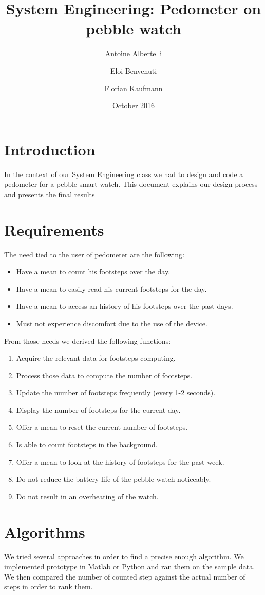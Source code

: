 \documentclass[12pt,twoside,a4paper]{article}
\title{System Engineering: Pedometer on pebble watch}
\author{Antoine Albertelli \and Eloi Benvenuti \and Florian Kaufmann}
\date{October 2016}
\begin{document}
\maketitle

\section{Introduction}
In the context of our System Engineering class we had to design and code a pedometer for a pebble smart	watch. This document explains our design process and presents the final results
\section{Requirements}
\label{requirements}
The need tied to the user of pedometer are the following:
\begin{itemize}
	\item Have a mean to count his footsteps over the day.
	\item Have a mean to easily read his current footsteps for the day.
	\item Have a mean to access an history of his footsteps over the past days.
	\item Must not experience discomfort due to the use of the device.
\end{itemize}

From those needs we derived the following functions:
\begin{enumerate}
	\item Acquire the relevant data for footsteps computing.
	\item Process those data to compute the number of footsteps.
	\item Update the number of footsteps frequently (every 1-2 seconds).
	\item Display the number of footsteps for the current day.
	\item Offer a mean to reset the current number of footsteps.
	\item Is able to count footsteps in the background.
	\item Offer a mean to look at the history of footsteps for the past week.
	\item Do not reduce the battery life of the pebble watch noticeably.
	\item Do not result in an overheating of the watch.
\end{enumerate}

\section{Algorithms}
We tried several approaches in order to find a precise enough algorithm.
We implemented prototype in Matlab or Python and ran them on the sample data.
We then compared the number of counted step against the actual number of steps in order to rank them.
\end{document}
